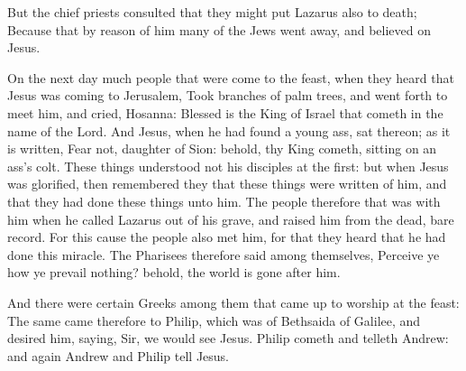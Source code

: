  But the chief priests consulted that they might put
Lazarus also to death;  Because that by reason of him many
of the Jews went away, and believed on Jesus.

 On the next day much people that were come to the feast,
when they heard that Jesus was coming to Jerusalem,  Took
branches of palm trees, and went forth to meet him, and cried, Hosanna:
Blessed is the King of Israel that cometh in the name of the Lord.
 And Jesus, when he had found a young ass, sat thereon; as
it is written,  Fear not, daughter of Sion: behold, thy
King cometh, sitting on an ass's colt.  These things
understood not his disciples at the first: but when Jesus was glorified,
then remembered they that these things were written of him, and that
they had done these things unto him.  The people therefore
that was with him when he called Lazarus out of his grave, and raised
him from the dead, bare record.  For this cause the people
also met him, for that they heard that he had done this miracle.
 The Pharisees therefore said among themselves, Perceive ye
how ye prevail nothing? behold, the world is gone after him.

 And there were certain Greeks among them that came up to
worship at the feast:  The same came therefore to Philip,
which was of Bethsaida of Galilee, and desired him, saying, Sir, we
would see Jesus.  Philip cometh and telleth Andrew: and
again Andrew and Philip tell Jesus.

